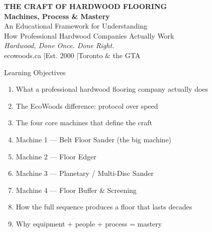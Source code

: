 \documentclass[aspectratio=169,10pt]{beamer}
\begin{document}
\begin{frame}
\begin{center}
\vspace{0.3cm}
{\fontsize{22}{26}\selectfont\textbf{\color{ecodark}THE CRAFT OF HARDWOOD FLOORING}}\\[0.12cm]
{\fontsize{17}{21}\selectfont\textbf{\color{ecodark}Machines, Process \& Mastery}}\\[0.35cm]
{\large An Educational Framework for Understanding\\How Professional Hardwood Companies Actually Work}\\[0.4cm]
{\large\textit{Hardwood, Done Once. Done Right.}}\\[0.22cm]
{\small ecowoods.ca \quad|\quad Est. 2000 \quad|\quad Toronto \& the GTA}
\end{center}
\end{frame}

\begin{frame}{Learning Objectives}
\vspace{0.05cm}
\begin{enumerate}
  \item What a professional hardwood flooring company actually does
  \item The EcoWoods difference: protocol over speed
  \item The four core machines that define the craft
  \item Machine 1 — Belt Floor Sander (the big machine)
  \item Machine 2 — Floor Edger
  \item Machine 3 — Planetary / Multi-Disc Sander
  \item Machine 4 — Floor Buffer \& Screening
  \item How the full sequence produces a floor that lasts decades
  \item Why equipment + people + process = mastery
\end{enumerate}
\end{frame}
\end{document}
